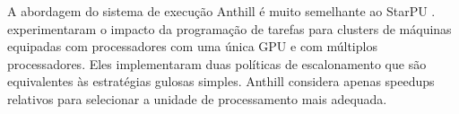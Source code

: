 A abordagem do sistema de execução Anthill é muito semelhante ao StarPU . \cite{Anthill} experimentaram o impacto da programação de tarefas para clusters de máquinas equipadas com processadores com uma única GPU e com múltiplos processadores. Eles implementaram duas políticas de escalonamento que são equivalentes às estratégias gulosas simples. Anthill considera apenas speedups relativos para selecionar a unidade de processamento mais adequada.






